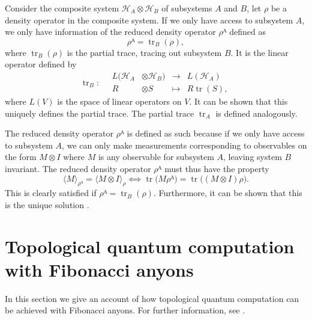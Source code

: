 Consider the composite system $\mathcal{H}_A ⊗ \mathcal{H}_B$ of subsystems $A$ and $B$, let $ρ$ be a density operator in the composite system. If we only have access to subsystem $A$, we only have information of the reduced density operator $ρᴬ$ defined as
\begin{equation}\label{eq:red dens op}
  ρᴬ = \operatorname{tr}_B(ρ),
\end{equation}
where $\operatorname{tr}_B(ρ)$ is the partial trace, tracing out subsystem $B$. It is the linear operator defined by
\begin{equation}
  \operatorname{tr}_B : \quad
  \begin{alignedat}{2}
    L(\mathcal{H}_A &⊗ \mathcal{H}_B) &{}\to{}& L(\mathcal{H}_A) \\
    R&⊗S &{}↦{}& R\operatorname{tr}(S),
  \end{alignedat}
\end{equation}
where $L(V)$ is the space of linear operators on $V$. It can be shown
that this uniquely defines the partial trace. The partial trace $\operatorname{tr}_A$ is defined analogously.

The reduced density operator $ρᴬ$ is defined as such because if we only have access to subsystem $A$, we can only make measurements corresponding to observables on the form $M⊗I$ where $M$ is any observable for subsystem $A$, leaving system $B$ invariant. The reduced density operator $ρᴬ$ must thus have the property
\begin{equation}
  ⟨M⟩_{ρᴬ} = ⟨M⊗I⟩_ρ ⟺
  \operatorname{tr}\big(Mρᴬ\big)
  = \operatorname{tr}\big((M⊗I)ρ\big).
\end{equation}
This is clearly satisfied if $ρᴬ = \operatorname{tr}_B(ρ)$. Furthermore, it can be shown that this is the unique solution \cite{nielsen chuang}.













\section{Topological quantum computation with Fibonacci anyons}\label{sec:computing with fibonacci}

In this section we give an account of how topological quantum computation can be achieved with Fibonacci anyons. For further information, see \cite{topological quantum compiling,kitaev fault-tolerant anyons,kauffman lomonaco,wang book,pachos book,asymptotical top compl,slingerland bais}.

